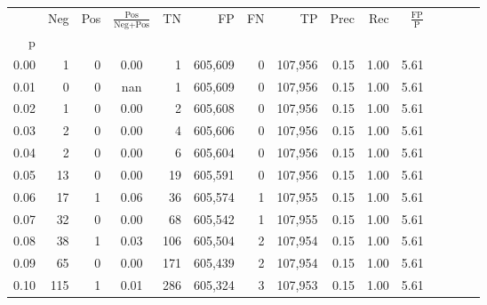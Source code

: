 \begin{tabular}{rrrcrrrrrrrrrrr}
\toprule
{} &     Neg &    Pos & $\frac{\text{Pos}}{\text{Neg}+\text{Pos}}$ &       TN &       FP &       FN &       TP &  Prec &   Rec & $\frac{\text{FP}}{\text{P}}$ \\
p    &         &        &                                            &          &          &          &          &       &       &                              \\
\midrule
0.00 &       1 &      0 &                                       0.00 &        1 &  605,609 &        0 &  107,956 &  0.15 &  1.00 &                         5.61 \\
0.01 &       0 &      0 &                                        nan &        1 &  605,609 &        0 &  107,956 &  0.15 &  1.00 &                         5.61 \\
0.02 &       1 &      0 &                                       0.00 &        2 &  605,608 &        0 &  107,956 &  0.15 &  1.00 &                         5.61 \\
0.03 &       2 &      0 &                                       0.00 &        4 &  605,606 &        0 &  107,956 &  0.15 &  1.00 &                         5.61 \\
0.04 &       2 &      0 &                                       0.00 &        6 &  605,604 &        0 &  107,956 &  0.15 &  1.00 &                         5.61 \\
0.05 &      13 &      0 &                                       0.00 &       19 &  605,591 &        0 &  107,956 &  0.15 &  1.00 &                         5.61 \\
0.06 &      17 &      1 &                                       0.06 &       36 &  605,574 &        1 &  107,955 &  0.15 &  1.00 &                         5.61 \\
0.07 &      32 &      0 &                                       0.00 &       68 &  605,542 &        1 &  107,955 &  0.15 &  1.00 &                         5.61 \\
0.08 &      38 &      1 &                                       0.03 &      106 &  605,504 &        2 &  107,954 &  0.15 &  1.00 &                         5.61 \\
0.09 &      65 &      0 &                                       0.00 &      171 &  605,439 &        2 &  107,954 &  0.15 &  1.00 &                         5.61 \\
0.10 &     115 &      1 &                                       0.01 &      286 &  605,324 &        3 &  107,953 &  0.15 &  1.00 &                         5.61 \\

\end{tabular}
